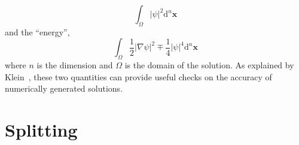 \begin{equation}
\int_{\Omega}\lvert\psi\rvert^2\mathrm{d}^n\bm x
\end{equation}
and the ``energy'',
\begin{equation}
\int_{\Omega}\frac{1}{2}\lvert\nabla \psi\rvert^2\mp\frac{1}{4}\lvert\psi\rvert^4\mathrm{d}^n\bm x
\end{equation}
where $n$ is the dimension and $\Omega$ is the domain of the solution. As explained by Klein~\cite{Kle08}, these two quantities can provide useful checks on the accuracy of numerically generated solutions.

\section{Splitting}

